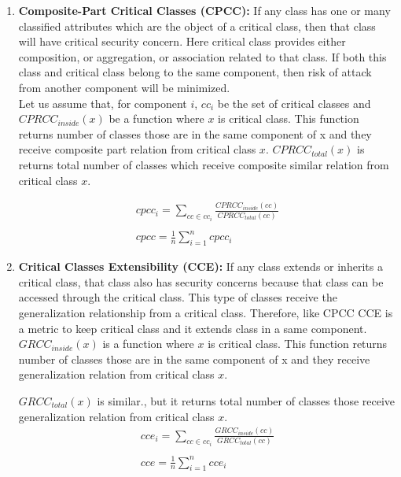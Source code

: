 \documentclass[letterpaper, 10 pt, conference]{ieeeconf}  %
\begin{document}
\begin{enumerate}
\item \textbf{Composite-Part Critical Classes (CPCC):} If any class has one or many classified attributes which are the object of a critical class, then that class will have critical security concern. Here critical class provides either composition, or aggregation, or association related to that class. If both this class and critical class belong to the same component, then risk of attack from another component will be minimized. \\
Let us assume that, for component $i$, $cc_{i}$ be the set of critical classes and $CPRCC_{inside}(x)$ be a function where $x$ is critical class. This function returns number of classes those are in the same component of x and they receive composite part relation from critical class $x$. 
$CPRCC_{total}(x)$ is returns total number of classes  which receive composite similar relation from critical class $x$.

\begin{equation}\label{cpcc_eq}
\begin{array}{l}
cpcc_{i}=\sum_{cc \in cc_{i}}{\frac{CPRCC_{inside}(cc)}{CPRCC_{total}(cc)}}\\\\
cpcc=\frac{1}{n}\sum_{i=1}^{n}{cpcc_{i}}
\end{array}
\end{equation}

\item \textbf{Critical Classes Extensibility (CCE):} If any class extends or inherits a critical class,  that class also  has security concerns because that class can be accessed through the critical class. This type of classes receive the generalization relationship from a critical class. Therefore, like CPCC CCE is a metric to keep critical class and it extends class in a same component. 
$GRCC_{inside}(x)$ is a function where $x$ is critical class. This function returns number of classes those are in the same component of x and they receive generalization relation from critical class $x$.

$GRCC_{total}(x)$ is similar., but it returns total number of classes those receive generalization relation from critical class $x$.
\begin{equation}\label{cce_eq}
\begin{array}{l}
cce_{i}=\sum_{cc \in cc_{i}}{\frac{GRCC_{inside}(cc)}{GRCC_{total}(cc)}}\\\\
cce=\frac{1}{n}\sum_{i=1}^{n}{cce_{i}}
\end{array}
\end{equation}


\end{enumerate}
\end{document}

